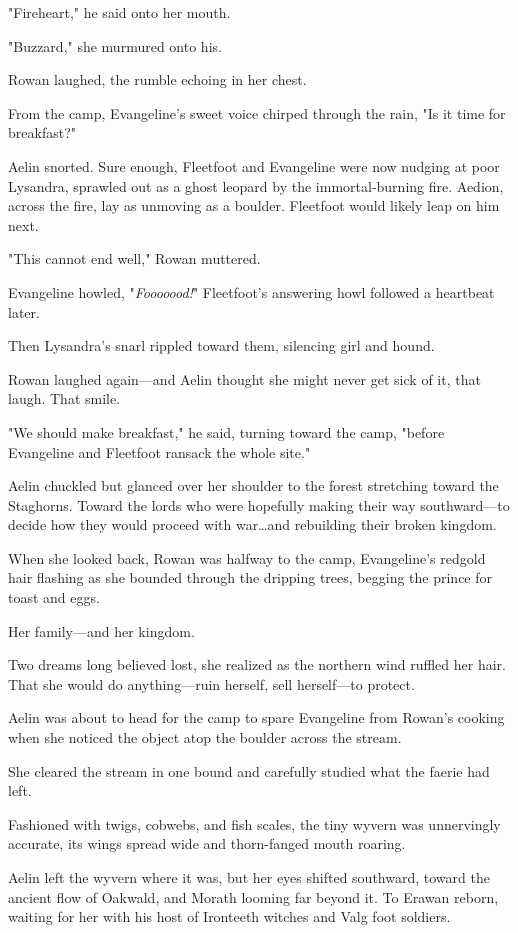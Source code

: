 "Fireheart," he said onto her mouth.

"Buzzard," she murmured onto his.

Rowan laughed, the rumble echoing in her chest.

From the camp, Evangeline's sweet voice chirped through the rain, "Is it time for breakfast?"

Aelin snorted.
Sure enough, Fleetfoot and Evangeline were now nudging at poor Lysandra, sprawled out as a ghost leopard by the immortal-burning fire.
Aedion, across the fire, lay as unmoving as a boulder.
Fleetfoot would likely leap on him next.

"This cannot end well," Rowan muttered.

Evangeline howled, "\emph{Fooooood!}" Fleetfoot's answering howl followed a heartbeat later.

Then Lysandra's snarl rippled toward them, silencing girl and hound.

Rowan laughed again---and Aelin thought she might never get sick of it, that laugh.
That smile.

"We should make breakfast," he said, turning toward the camp, "before Evangeline and Fleetfoot ransack the whole site."

Aelin chuckled but glanced over her shoulder to the forest stretching toward the Staghorns.
Toward the lords who were hopefully making their way southward---to decide how they would proceed with war\ldots and rebuilding their broken kingdom.

When she looked back, Rowan was halfway to the camp, Evangeline's redgold hair flashing as she bounded through the dripping trees, begging the prince for toast and eggs.

Her family---and her kingdom.

Two dreams long believed lost, she realized as the northern wind ruffled her hair.
That she would do anything---ruin herself, sell herself---to protect.

Aelin was about to head for the camp to spare Evangeline from Rowan's cooking when she noticed the object atop the boulder across the stream.

She cleared the stream in one bound and carefully studied what the faerie had left.

Fashioned with twigs, cobwebs, and fish scales, the tiny wyvern was unnervingly accurate, its wings spread wide and thorn-fanged mouth roaring.

Aelin left the wyvern where it was, but her eyes shifted southward, toward the ancient flow of Oakwald, and Morath looming far beyond it.
To Erawan reborn, waiting for her with his host of Ironteeth witches and Valg foot soldiers.

